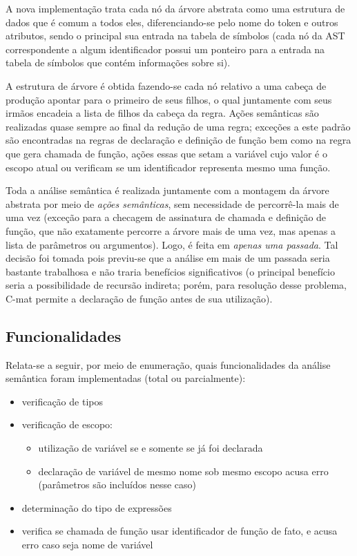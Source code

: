 \documentclass[
	article,			%
	11pt,				%
	oneside,			%
	a4paper,			%
	english,			%
	brazil,				%
	sumario=tradicional
	]{abntex2}
\renewcommand{\it}[1]{\textit{#1}}
\begin{document}
A nova implementação trata cada nó da árvore abstrata como uma estrutura de dados que é comum a todos eles, diferenciando-se pelo nome do token e outros atributos, sendo o principal sua entrada na tabela de símbolos (cada nó da AST correspondente a algum identificador possui um 
ponteiro para a entrada na tabela de símbolos que contém informações sobre si).

A estrutura de árvore é obtida fazendo-se cada nó relativo a uma cabeça de produção apontar para o primeiro de seus filhos, o qual juntamente com seus irmãos encadeia a lista de filhos da cabeça da regra. Ações semânticas são realizadas quase sempre ao final da redução de uma regra; exceções a este padrão
são encontradas na regras de declaração e definição de função bem como na regra que gera chamada de função, ações essas que setam a variável cujo valor é o escopo atual ou verificam se um
identificador representa mesmo uma função.

Toda a análise semântica é realizada juntamente com a montagem da árvore abstrata por meio de \it{ações semânticas}, sem necessidade de percorrê-la mais de uma vez (exceção para a checagem de assinatura de chamada e definição de função, que não exatamente percorre a árvore mais de uma vez, mas apenas a lista de parâmetros ou argumentos). Logo, é feita em \it{apenas uma passada}. Tal decisão foi tomada pois previu-se que a análise em mais de um passada seria bastante trabalhosa e não traria benefícios significativos (o principal
benefício seria a possibilidade de recursão indireta; porém, para resolução desse problema, C-mat permite a declaração de função antes de sua utilização).

\subsection{Funcionalidades}
Relata-se a seguir, por meio de enumeração, quais funcionalidades da análise semântica foram implementadas (total ou parcialmente):
\begin{itemize}
	\item verificação de tipos
	\item verificação de escopo:
		\begin{itemize}
			\item utilização de variável se e somente se já foi declarada
			\item declaração de variável de mesmo nome sob mesmo escopo acusa erro (parâmetros são incluídos nesse caso)
		\end{itemize}
	\item determinação do tipo de expressões
	\item verifica se chamada de função usar identificador de função de fato, e acusa erro caso seja nome de variável
\end{itemize}
\end{document}
